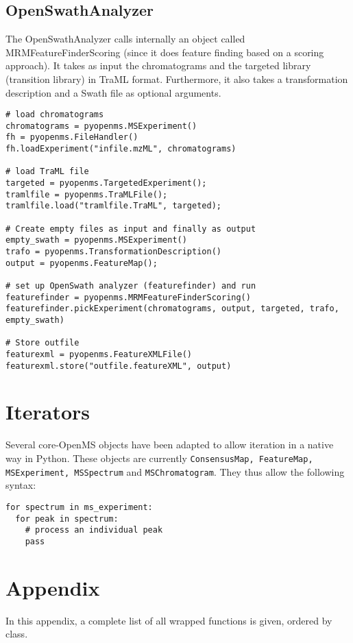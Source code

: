 \documentclass[10pt]{article}
\begin{document}
\subsection{OpenSwathAnalyzer}

The OpenSwathAnalyzer calls internally an object called
MRMFeatureFinderScoring (since it does feature finding based on a scoring
approach). It takes as input the chromatograms and the targeted library
(transition library) in TraML format. Furthermore, it also takes a
transformation description and a Swath file as optional arguments.

\begin{verbatim}
# load chromatograms
chromatograms = pyopenms.MSExperiment()
fh = pyopenms.FileHandler()
fh.loadExperiment("infile.mzML", chromatograms)

# load TraML file
targeted = pyopenms.TargetedExperiment();
tramlfile = pyopenms.TraMLFile();
tramlfile.load("tramlfile.TraML", targeted);

# Create empty files as input and finally as output
empty_swath = pyopenms.MSExperiment()
trafo = pyopenms.TransformationDescription()
output = pyopenms.FeatureMap();

# set up OpenSwath analyzer (featurefinder) and run
featurefinder = pyopenms.MRMFeatureFinderScoring()
featurefinder.pickExperiment(chromatograms, output, targeted, trafo, empty_swath)

# Store outfile
featurexml = pyopenms.FeatureXMLFile()
featurexml.store("outfile.featureXML", output)
\end{verbatim}

\section{Iterators}

Several core-OpenMS objects have been adapted to allow iteration in a native
way in Python. These objects are currently \texttt{ConsensusMap, FeatureMap,
MSExperiment, MSSpectrum} and \texttt{MSChromatogram}. They thus allow the
following syntax: 

\begin{verbatim}
for spectrum in ms_experiment:
  for peak in spectrum:
    # process an individual peak
    pass
\end{verbatim}

\section{Appendix}
In this appendix, a complete list of all wrapped functions is given, ordered
by class.


\end{document}
